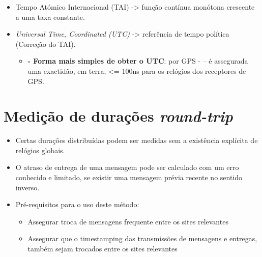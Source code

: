 \documentclass{article}
\begin{document}
\begin{itemize}
    \item Tempo Atómico Internacional (TAI) -> função contínua monótona crescente a uma taxa constante.
    \item \textit{Universal Time, Coordinated (UTC)} -> referência de tempo política (Correção do TAI).
    \begin{itemize}
        \item \textbf{- Forma mais simples de obter o UTC}: por GPS - – é assegurada uma exactidão, em terra, <= 100ns para os relógios dos receptores de GPS.
    \end{itemize}

\end{itemize}

\section{Medição de durações \textit{round-trip}}

\begin{itemize}
    \item Certas durações distribuídas podem ser medidas sem a existência explícita de relógios globais.
    \item O atraso de entrega de uma mensagem pode ser calculado com um erro conhecido e limitado, se existir uma mensagem prévia recente no sentido inverso.
    \item Pré-requisitos para o uso deste método:
    \begin{itemize}
        \item Assegurar troca de mensagens frequente entre os sites relevantes
        \item Assegurar que o timestamping das transmissões de mensagens e entregas, também sejam trocados entre os sites relevantes
    \end{itemize}
\end{itemize}
\end{document}
